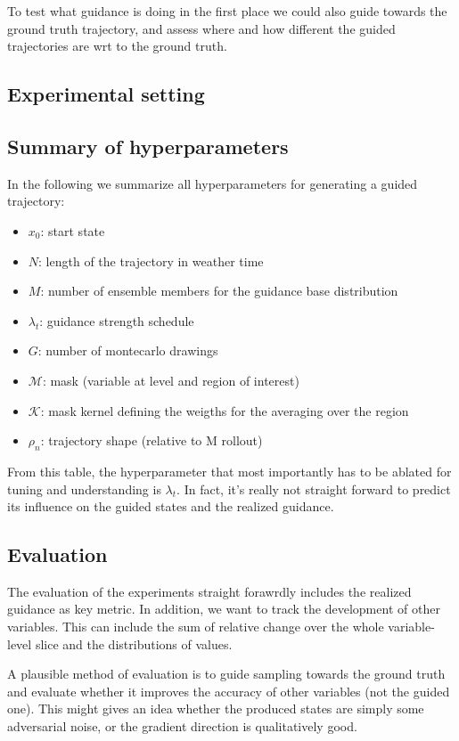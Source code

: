 \documentclass[a4paper,12pt]{article}
\begin{document}
To test what guidance is doing in the first place we could also guide towards the ground truth trajectory,
and assess where and how different the guided trajectories are wrt to the ground truth.

\subsection{Experimental setting}
\subsection{Summary of hyperparameters}
In the following we summarize all hyperparameters for generating a guided trajectory:
\begin{itemize}[noitemsep]
    \item $x_0$: start state
    \item $N$: length of the trajectory in weather time
    \item $M$: number of ensemble members for the guidance base distribution
    \item $\lambda_t$: guidance strength schedule
    \item $G$: number of montecarlo drawings
    \item $\mathcal{M}$: mask (variable at level and region of interest) 
    \item $\mathcal{K}$: mask kernel defining the weigths for the averaging over the region
    \item $\rho_n$: trajectory shape (relative to M rollout)
\end{itemize}
From this table, the hyperparameter that most importantly has to be ablated for tuning and understanding is $\lambda_t$. 
In fact, it's really not straight forward to predict its influence on the guided states and the realized guidance.

\subsection{Evaluation}
The evaluation of the experiments straight forawrdly includes the realized guidance as key metric.
In addition, we want to track the development of other variables. This can include the sum of relative change over the whole variable-level slice and the distributions of values.

A plausible method of evaluation is to guide sampling towards the ground truth and evaluate whether it improves the accuracy of other variables (not the guided one).
This might gives an idea whether the produced states are simply some adversarial noise, or the gradient direction is qualitatively good.
\end{document}
